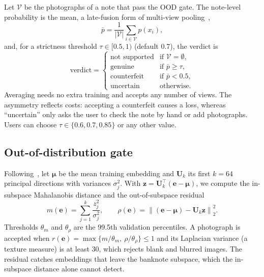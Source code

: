 \documentclass[pdflatex,sn-mathphys-num]{sn-jnl}
\begin{document}
Let $\mathcal{V}$ be the photographs of a note that pass the OOD gate. The note-level
probability is the mean, a late-fusion form of multi-view pooling~\cite{su2015mvcnn},
\begin{equation}
\bar{p} = \frac{1}{|\mathcal{V}|}\sum_{i\in\mathcal{V}} p(x_i),
\label{eq:fusion}
\end{equation}
and, for a strictness threshold $\tau\in[0.5,1)$ (default 0.7), the verdict is
\begin{equation}
\text{verdict} =
\begin{cases}
\text{not supported} & \text{if } \mathcal{V}=\emptyset,\\
\text{genuine} & \text{if } \bar{p}\ge\tau,\\
\text{counterfeit} & \text{if } \bar{p}<0.5,\\
\text{uncertain} & \text{otherwise.}
\end{cases}
\label{eq:decision}
\end{equation}
Averaging needs no extra training and accepts any number of views. The asymmetry
reflects costs: accepting a counterfeit causes a loss, whereas ``uncertain'' only asks
the user to check the note by hand or add photographs. Users can choose
$\tau\in\{0.6,0.7,0.85\}$ or any other value.

\subsection{Out-of-distribution gate}\label{sec:ood}

Following~\cite{lee2018mahalanobis}, let $\boldsymbol{\mu}$ be the mean training
embedding and $\mathbf{U}_k$ its first $k=64$ principal directions with variances
$\sigma_j^2$. With $\mathbf{z}=\mathbf{U}_k^{\top}(\mathbf{e}-\boldsymbol{\mu})$, we
compute the in-subspace Mahalanobis distance and the out-of-subspace residual
\begin{equation}
m(\mathbf{e}) = \sum_{j=1}^{k}\frac{z_j^2}{\sigma_j^2},\qquad
\rho(\mathbf{e}) = \left\lVert(\mathbf{e}-\boldsymbol{\mu})-\mathbf{U}_k\mathbf{z}\right\rVert_2^2 .
\label{eq:ood}
\end{equation}
Thresholds $\theta_m$ and $\theta_\rho$ are the 99.5th validation percentiles. A
photograph is accepted when $r(\mathbf{e})=\max\{m/\theta_m,\ \rho/\theta_\rho\}\le1$
and its Laplacian variance (a texture measure) is at least 30, which rejects blank and
blurred images. The residual catches embeddings that leave the banknote subspace, which
the in-subspace distance alone cannot detect.
\end{document}
